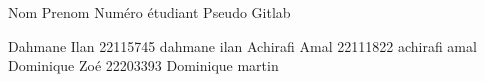 Nom Prenom Numéro étudiant Pseudo Gitlab

Dahmane Ilan 22115745 dahmane ilan Achirafi Amal 22111822 achirafi amal Dominique Zoé 22203393 Dominique martin 
